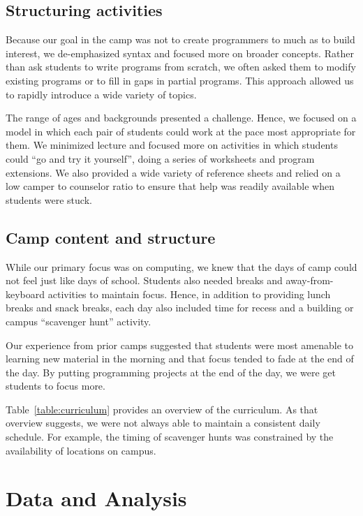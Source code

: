\subsection{Structuring activities}

Because our goal in the camp was not to create programmers to much as
to build interest, we de-emphasized syntax and focused more on broader
concepts.  Rather than ask students to write programs from scratch, we often
asked them to modify existing programs or to fill in gaps in partial
programs.  This approach allowed us to rapidly introduce a wide
variety of topics.

The range of ages and backgrounds presented a challenge.  Hence,
we focused on a model in which each pair of students could work at the
pace most appropriate for them.  We minimized lecture and focused more
on activities in which students could ``go and try it yourself'', doing
a series of worksheets and program extensions.  We also provided a wide
variety of reference sheets and relied on a low camper to counselor
ratio to ensure that help was readily available when students were stuck.

\subsection{Camp content and structure}

While our primary focus was on computing, we knew that the days of
camp could not feel just like days of school.  Students also needed
breaks and away-from-keyboard activities to maintain focus. Hence,
in addition to providing lunch breaks and snack breaks, each day
also included time for recess and a building or campus ``scavenger
hunt'' activity.

Our experience from prior camps suggested that students were most
amenable to learning new material in the morning and that focus
tended to fade at the end of the day.  By putting programming
projects at the end of the day, we were get students to focus more.

Table~\ref{table:curriculum} provides an overview of the curriculum.
As that overview suggests, we were not always able to maintain a
consistent daily schedule.  For example, the timing of scavenger
hunts was constrained by the availability of locations on campus.

\section{Data and Analysis}


